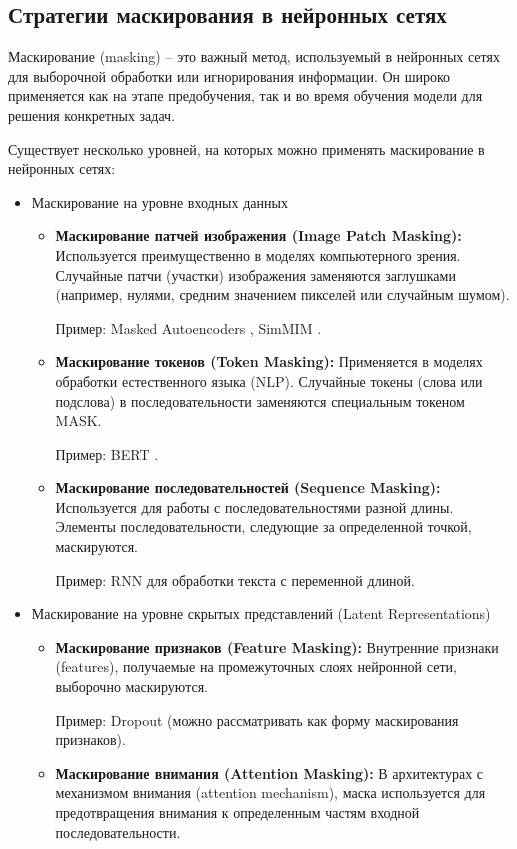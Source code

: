 \subsection{Стратегии маскирования в нейронных сетях}
Маскирование (masking) -- это важный метод, используемый в нейронных сетях для выборочной обработки или игнорирования информации. Он широко применяется как на этапе предобучения, так и во время обучения модели для решения конкретных задач. 

Существует несколько уровней, на которых можно применять маскирование в нейронных сетях:
\begin{itemize}
    \item{Маскирование на уровне входных данных}

    \begin{itemize}
        \item \textbf{Маскирование патчей изображения (Image Patch Masking):} Используется преимущественно в моделях компьютерного зрения. Случайные патчи (участки) изображения заменяются заглушками (например, нулями, средним значением пикселей или случайным шумом). 
        
        Пример: Masked Autoencoders \cite{he2021masked}, SimMIM \cite{xie2021simmim}.
        \item \textbf{Маскирование токенов (Token Masking):} Применяется в моделях обработки естественного языка (NLP). Случайные токены (слова или подслова) в последовательности заменяются специальным токеном MASK. 
        
        Пример: BERT \cite{devlin2018bert}.
        \item \textbf{Маскирование последовательностей (Sequence Masking):} Используется для работы с последовательностями разной длины.  Элементы последовательности, следующие за определенной точкой, маскируются. 
        
        Пример: RNN для обработки текста с переменной длиной.
    \end{itemize}

    \item{Маскирование на уровне скрытых представлений (Latent Representations)}

    \begin{itemize}
        \item \textbf{Маскирование признаков (Feature Masking):} Внутренние признаки (features), получаемые на промежуточных слоях нейронной сети, выборочно маскируются.
        
        Пример: Dropout (можно рассматривать как форму маскирования признаков).
        \item \textbf{Маскирование внимания (Attention Masking):} В архитектурах с механизмом внимания (attention mechanism), маска используется для предотвращения внимания к определенным частям входной последовательности. 
        

\end{itemize}
\end{itemize}
